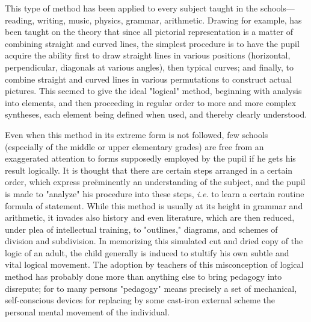 \documentclass[showtrims,ustradepaper]{memoir}
\begin{document}

This type of method has been applied to every subject taught in the
schools---reading, writing, music, physics, grammar, arithmetic. Drawing
for
example,
has been taught on the theory that since all pictorial representation is
a matter of combining straight and curved lines, the simplest procedure
is to have the pupil acquire the ability first to draw straight lines in
various positions (horizontal, perpendicular, diagonals at various
angles), then typical curves; and finally, to combine straight and
curved lines in various permutations to construct actual pictures. This
seemed to give the ideal "logical" method, beginning with analysis into
elements, and then proceeding in regular order to more and more complex
syntheses, each element being defined when used, and thereby clearly
understood.


Even when this method in its extreme form is not followed, few schools
(especially of the middle or upper elementary grades) are free from an
exaggerated attention to forms supposedly employed by the pupil if he
gets his result logically. It is thought that there are certain steps
arranged in a certain order, which express preëminently an understanding
of the subject, and the pupil is made to "analyze" his procedure into
these steps, \emph{i.e.} to learn a certain routine formula of
statement. While this method is usually at its height in grammar and
arithmetic, it invades also history and even literature, which are then
reduced, under plea of intellectual training, to "outlines," diagrams,
and schemes of division and subdivision. In memorizing this simulated
cut and dried copy of the logic of an adult, the child generally is
induced to stultify his own subtle and vital logical movement. The
adoption by teachers of this misconception of logical method has
probably done more than anything else to bring pedagogy into disrepute;
for to many persons "pedagogy" means precisely a set of mechanical,
self-conscious devices for replacing by
some
cast-iron external scheme the personal mental movement of the
individual.

\end{document}

